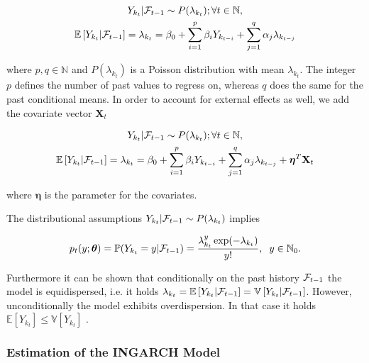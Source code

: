 \begin{gather}
\label{eq:Ingarch model}
Y_{k_t} | \mathcal{F}_{t-1} \sim P(\lambda_{k_t}); \forall t \in \mathbb{N}, \\
\mathbb{E}\left[Y_{k_t} | \mathcal{F}_{t-1} \right] = \lambda_{k_t} = \beta_0 + \sum_{i=1}^p\beta_i Y_{k_{t-i}} + \sum_{j=1}^q\alpha_j \lambda_{k_{t-j}}
\end{gather}

where $p,q \in \mathbb{N}$ and $P(\lambda_{k_t})$ is a Poisson distribution with mean $\lambda_{k_t}$. The integer $p$ defines the number of past values to regress on, whereas $q$ does the same for the past conditional means. In order to account for external effects as well, we add the covariate vector $\textbf{X}_t$

\begin{gather}
\label{eq:Ingarch model with external effect}
Y_{k_t} | \mathcal{F}_{t-1} \sim P(\lambda_{k_t}); \forall t \in \mathbb{N}, \\
\mathbb{E}\left[Y_{k_t} | \mathcal{F}_{t-1} \right] = \lambda_{k_t} = \beta_0 + \sum_{i=1}^p\beta_i Y_{k_{t-i}} + \sum_{j=1}^q\alpha_j \lambda_{k_{t-j}} + \bm{\eta}^T\textbf{X}_t
\end{gather}

where $\bm{\eta}$ is the parameter for the covariates. 

The distributional assumptions $Y_{k_t} | \mathcal{F}_{t-1} \sim P(\lambda_{k_t})$ implies 

\begin{equation}
p_t(y;\bm{\theta})=\mathbb{P}(Y_{k_t}=y | \mathcal{F}_{t-1}) = \frac{\lambda_{k_t}^y \exp(-\lambda_{k_t})}{y!}, \hspace{0.2cm} y \in \mathbb{N}_0.
\label{eq:Ingarch Distribution}
\end{equation}

Furthermore it can be shown that conditionally on the past history $\mathcal{F}_{t-1}$ the model is equidispersed, i.e. it holds $\lambda_{k_t} = \mathbb{E}\left[Y_{k_t} | \mathcal{F}_{t-1}\right] = \mathbb{V}\left[Y_{k_t} | \mathcal{F}_{t-1}\right]$. However, unconditionally the model exhibits overdispersion. In that case it holds $\mathbb{E}\left[Y_{k_t}\right] \leq \mathbb{V}\left[Y_{k_t}\right] $ \cite{Heinen:2003}. 

\subsubsection{Estimation of the INGARCH Model}
\label{sec: Estimation of the Ingarch Model}


